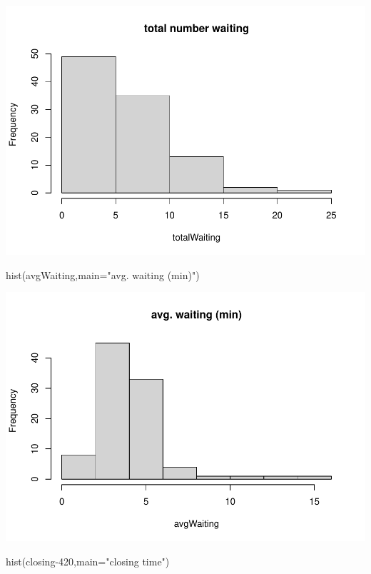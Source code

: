 \documentclass[
]{book}
\newenvironment{Shaded}{\begin{snugshade}}{\end{snugshade}}
\newcommand{\AttributeTok}[1]{\textcolor[rgb]{0.77,0.63,0.00}{#1}}
\newcommand{\DecValTok}[1]{\textcolor[rgb]{0.00,0.00,0.81}{#1}}
\newcommand{\FunctionTok}[1]{\textcolor[rgb]{0.00,0.00,0.00}{#1}}
\newcommand{\NormalTok}[1]{#1}
\newcommand{\StringTok}[1]{\textcolor[rgb]{0.31,0.60,0.02}{#1}}
\theoremstyle{definition}
\theoremstyle{definition}
\theoremstyle{definition}
\theoremstyle{definition}
\theoremstyle{remark}
\begin{document}
\includegraphics{_main_files/figure-latex/unnamed-chunk-10-2.pdf}

\begin{Shaded}
\begin{Highlighting}[]
 \FunctionTok{hist}\NormalTok{(avgWaiting,}\AttributeTok{main=}\StringTok{"avg. waiting (min)"}\NormalTok{)}
\end{Highlighting}
\end{Shaded}

\includegraphics{_main_files/figure-latex/unnamed-chunk-10-3.pdf}

\begin{Shaded}
\begin{Highlighting}[]
 \FunctionTok{hist}\NormalTok{(closing}\DecValTok{{-}420}\NormalTok{,}\AttributeTok{main=}\StringTok{"closing time"}\NormalTok{)}
\end{Highlighting}
\end{Shaded}
\end{document}

